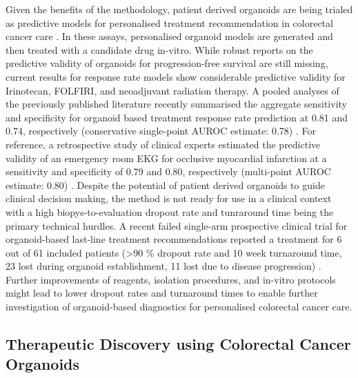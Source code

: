 \begin{flushleft}
Given the benefits of the methodology, patient derived organoids are being trialed as predictive models for personalised treatment recommendation in colorectal cancer care \cite{VanDeWetering2015, Vlachogiannis2018, ganeshRectalCancerOrganoid2019a, ooftPatientderivedOrganoidsCan2019a, yaoPatientDerivedOrganoidsPredict2020a}. In these assays, personalised organoid models are generated and then treated with a candidate drug in-vitro. While robust reports on the predictive validity of organoids for progression-free survival are still missing, current results for response rate models show considerable predictive validity for Irinotecan, FOLFIRI, and neoadjuvant radiation therapy. A pooled analyses of the previously published literature recently summarised the aggregate sensitivity and specificity for organoid based treatment response rate prediction at 0.81 and 0.74, respectively (conservative single-point AUROC estimate: 0.78) \cite{wensinkPatientderivedOrganoidsPredictive2021, zhangNoteROCAnalysis2005}. For reference, a retrospective study of clinical experts estimated the predictive validity of an emergency room EKG for occlusive myocardial infarction at a sensitivity and specificity of 0.79 and 0.80, respectively (multi-point AUROC estimate: 0.80) \cite{al-zaitiMachineLearningECG2023}. Despite the potential of patient derived organoids to guide clinical decision making, the method is not ready for use in a clinical context with a high biopys-to-evaluation dropout rate and tunraround time being the primary technical hurdles. A recent failed single-arm prospective clinical trial for organoid-based last-line treatment recommendations reported a treatment for 6 out of 61 included patients (>90 \% dropout rate and 10 week turnaround time, 23 lost during organoid establishment, 11 lost due to disease progression) \cite{ooftProspectiveExperimentalTreatment2021}. Further improvements of reagents, isolation procedures, and in-vitro protocols might lead to lower dropout rates and turnaround times to enable further investigation of organoid-based diagnostics for personalised colorectal cancer care. \par

\subsection{Therapeutic Discovery using Colorectal Cancer Organoids}


\end{flushleft}
